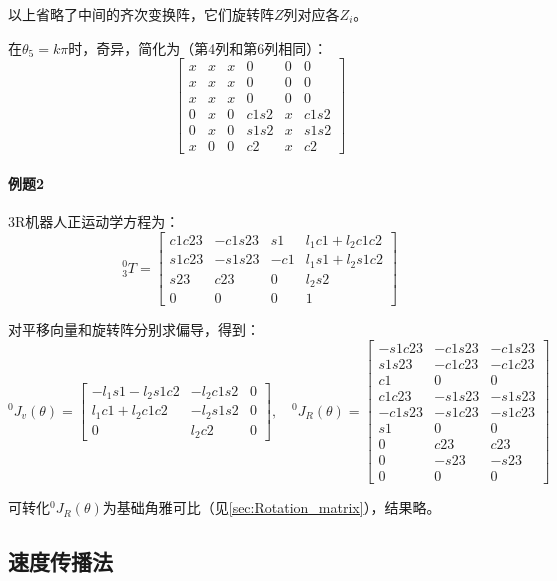 \documentclass[
12pt, %
a4paper, 
oneside, %
headinclude,footinclude, %
]{scrartcl}
\begin{document}
{以上省略了中间的齐次变换阵，它们旋转阵$ Z $列对应各$ Z_i $。

在$ \theta_5 = k\pi $时，奇异，简化为（第4列和第6列相同）：
$$ \begin{bmatrix} x & x & x & 0 & 0 & 0 \\ x & x & x & 0 & 0 & 0 \\ x & x & x & 0 & 0 & 0 \\ 0 & x & 0 & c1 s2 & x & c1 s2 \\ 0 & x & 0 & s1 s2 & x & s1 s2 \\ x & 0 & 0 & c2 & x & c2 \end{bmatrix} $$
}
\paragraph{例题2}\label{sec:example4.2}
{\footnotesize
3R机器人正运动学方程为：
$$ {}_3^0 T = \begin{bmatrix} c1 c23 & -c1 s23 & s1 & l_1 c1 + l_2 c1 c2 \\ s1 c23 & -s1 s23 & -c1 & l_1 s1 + l_2 s1 c2 \\ s23 & c23 & 0 & l_2 s2 \\ 0 & 0 & 0 & 1 \end{bmatrix} $$

对平移向量和旋转阵分别求偏导，得到：
$$
{}^0 J_v(\theta) = \begin{bmatrix} -l_1 s1 - l_2 s1 c2 & -l_2 c1 s2 & 0 \\ l_1 c1 + l_2 c1 c2 & -l_2 s1 s2 & 0 \\ 0 & l_2 c2 & 0 \end{bmatrix}, \quad
{}^0 J_R(\theta) = \begin{bmatrix} -s1 c23 & -c1 s23 & -c1 s23 \\ s1 s23 & -c1 c23 & -c1 c23 \\ c1 & 0 & 0 \\ c1 c23 & -s1 s23 & -s1 s23 \\ -c1 s23 & -s1 c23 & -s1 c23 \\ s1 & 0 & 0 \\ 0 & c23 & c23 \\ 0 & -s23 & -s23 \\ 0 & 0 & 0 \end{bmatrix}
$$

可转化$ {}^0 J_R(\theta) $为基础角雅可比（见\ref{sec:Rotation_matrix}），结果略。
}
\subsection[速度传播法]{速度传播法}
\end{document}
